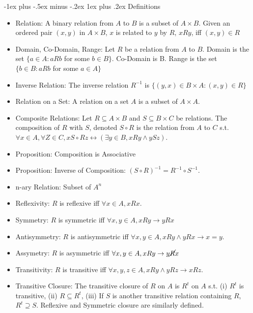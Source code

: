 \documentclass[10pt, portrait]{article}
\makeatletter
\renewcommand{\subsection}{\@startsection{subsection}{3}{0mm}%
                                {-1ex plus -.5ex minus -.2ex}%
                                {1ex plus .2ex}%
                                {\normalfont\small\bfseries}}%
\makeatother
\begin{document}
\begin{multicols*}{2}
\subsection{Definitions}
\begin{itemize}
    \item Relation: A binary relation from $A$ to $B$ is a subset of $A \times B$. Given an ordered pair $(x, y)$ in $A \times B$, $x$ is related to $y$ by $R$, $x R y$, iff $(x, y) \in R$
    \item Domain, Co-Domain, Range: Let $R$ be a relation from $A$ to $B$. Domain is the set $\{a \in A : a R b$ for some $b \in B\}$. Co-Domain is B. Range is the set $\{b \in B : a R b$ for some $a \in A\}$
    \item Inverse Relation: The inverse relation $R^{-1}$ is $\{(y, x) \in B \times A : (x, y) \in R\}$
    \item Relation on a Set: A relation on a set $A$ is a subset of $A \times A$.
    \item Composite Relations: Let $R \subseteq A \times B$ and $S \subseteq B \times C$ be relations. The composition of $R$ with $S$, denoted $S \circ R$ is the relation from $A$ to $C$ s.t. $\forall x \in A, \forall Z \in C, x S \circ R z \leftrightarrow (\exists y \in B, x R y \land y S z)$.
    \item Proposition: Composition is Associative
    \item Proposition: Inverse of Composition: $(S \circ R)^{-1} = R^{-1} \circ S^{-1}$.
    \item n-ary Relation: Subset of $A^n$
    \item Reflexivity: $R$ is reflexive iff $\forall x \in A, x R x$.
    \item Symmetry: $R$ is symmetric iff $\forall x, y \in A, x R y \rightarrow y R x$
    \item Antisymmetry: $R$ is antisymmetric iff $\forall x, y \in A, x R y \land y R x \rightarrow x = y$.
    \item Assymetry: $R$ is asymmetric iff $\forall x, y \in A, x R y \rightarrow y \cancel{R} x$
    \item Transitivity: $R$ is transitive iff $\forall x, y, z \in A, x R y \land y R z \rightarrow x R z$.
    \item Transitive Closure: The transitive closure of $R$ on $A$ is $R^t$ on $A$ s.t. (i) $R^t$ is transitive, (ii) $R \subseteq R^t$, (iii) If $S$ is another transitive relation containing $R$, $R^t \supseteq S$. Reflexive and Symmetric closure are similarly defined.

\end{itemize}
\end{multicols*}
\end{document}
